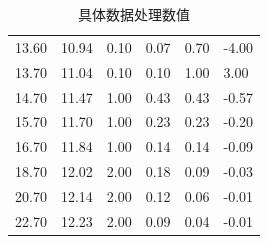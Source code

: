 \documentclass[UTF8,AutoFakeBold]{ctexbook}
\begin{document}
\begin{table}
\begin{tabular}{p{2cm}<{\centering} p{2cm}<{\centering} p{2cm}<{\centering} p{2cm}<{\centering} p{2cm}<{\centering} p{2cm}<{\centering}}
        13.60 & 10.94 & 0.10 & 0.07 & 0.70 & -4.00  \\ 
        13.70 & 11.04 & 0.10 & 0.10 & 1.00 & 3.00  \\ 
        14.70 & 11.47 & 1.00 & 0.43 & 0.43 & -0.57  \\ 
        15.70 & 11.70 & 1.00 & 0.23 & 0.23 & -0.20  \\ 
        16.70 & 11.84 & 1.00 & 0.14 & 0.14 & -0.09  \\ 
        18.70 & 12.02 & 2.00 & 0.18 & 0.09 & -0.03  \\ 
        20.70 & 12.14 & 2.00 & 0.12 & 0.06 & -0.01  \\ 
        22.70 & 12.23 & 2.00 & 0.09 & 0.04 & -0.01  \\        \bottomrule
    \end{tabular}
    \caption{具体数据处理数值}
\end{table}
\end{document}
